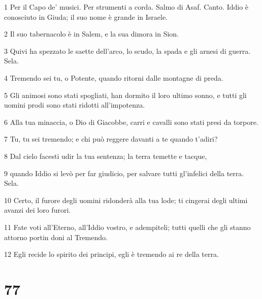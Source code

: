 \par 1 Per il Capo de' musici. Per strumenti a corda. Salmo di Asaf. Canto. Iddio è conosciuto in Giuda; il suo nome è grande in Israele.
\par 2 Il suo tabernacolo è in Salem, e la sua dimora in Sion.
\par 3 Quivi ha spezzato le saette dell'arco, lo scudo, la spada e gli arnesi di guerra. Sela.
\par 4 Tremendo sei tu, o Potente, quando ritorni dalle montagne di preda.
\par 5 Gli animosi sono stati spogliati, han dormito il loro ultimo sonno, e tutti gli uomini prodi sono stati ridotti all'impotenza.
\par 6 Alla tua minaccia, o Dio di Giacobbe, carri e cavalli sono stati presi da torpore.
\par 7 Tu, tu sei tremendo; e chi può reggere davanti a te quando t'adiri?
\par 8 Dal cielo facesti udir la tua sentenza; la terra temette e tacque,
\par 9 quando Iddio si levò per far giudicio, per salvare tutti gl'infelici della terra. Sela.
\par 10 Certo, il furore degli uomini ridonderà alla tua lode; ti cingerai degli ultimi avanzi dei loro furori.
\par 11 Fate voti all'Eterno, all'Iddio vostro, e adempiteli; tutti quelli che gli stanno attorno portin doni al Tremendo.
\par 12 Egli recide lo spirito dei principi, egli è tremendo ai re della terra.

\chapter{77}

